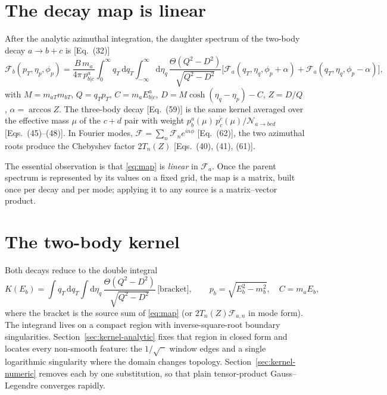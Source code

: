\documentclass[11pt]{article}
\newcommand{\Fa}{\mathcal{F}_a}
\newcommand{\Fb}{\mathcal{F}_b}
\newcommand{\Fan}{\mathcal{F}_{a,n}}
\begin{document}
\section{The decay map is linear}

After the analytic azimuthal integration, the daughter spectrum of the
two-body decay $a\to b+c$ is [Eq.~(32)]
\begin{equation}
\Fb(p_T,\eta_p,\phi_p)
 = \frac{B\,m_a}{4\pi\,p^a_{b|c}}
 \int_0^\infty \! q_T\,\mathrm{d}q_T \int_{-\infty}^{\infty}\!\mathrm{d}\eta_q\,
 \frac{\Theta\!\left(Q^2-D^2\right)}{\sqrt{Q^2-D^2}}
 \Big[\Fa(q_T,\eta_q,\phi_p+\alpha)+\Fa(q_T,\eta_q,\phi_p-\alpha)\Big],
 \label{eq:map}
\end{equation}
with $M=m_{aT}m_{bT}$, $Q=q_Tp_T$, $C=m_aE^a_{b|c}$,
$D=M\cosh(\eta_q-\eta_p)-C$, $Z=D/Q$, $\alpha=\arccos Z$.  The three-body
decay [Eq.~(59)] is the same kernel averaged over the effective mass $\mu$
of the $c+d$ pair with weight $p^a_b(\mu)\,p^{\tilde c}_c(\mu)/\mathcal
N_{a\to bcd}$ [Eqs.~(45)--(48)].  In Fourier modes,
$\mathcal F=\sum_n \mathcal F_n e^{in\phi}$ [Eq.~(62)], the two azimuthal
roots produce the Chebyshev factor $2T_n(Z)$ [Eqs.~(40), (41), (61)].

The essential observation is that \eqref{eq:map} is \emph{linear} in
$\Fa$.  Once the parent spectrum is represented by its values on a fixed
grid, the map is a matrix, built once per decay and per mode; applying it
to any source is a matrix--vector product.

\section{The two-body kernel}
\label{sec:quadrature}

Both decays reduce to the double integral
\begin{equation}
K(E_b)=\int q_T\,\mathrm{d}q_T\int\mathrm{d}\eta_q\,
\frac{\Theta\!\left(Q^2-D^2\right)}{\sqrt{Q^2-D^2}}\,
\big[\text{bracket}\big],
\qquad p_b=\sqrt{E_b^2-m_b^2},\quad C=m_aE_b,
\label{eq:K}
\end{equation}
where the bracket is the source sum of \eqref{eq:map} (or $2T_n(Z)\Fan$
in mode form).  The integrand lives on a compact region with
inverse-square-root boundary singularities.  Section~\ref{sec:kernel-analytic}
fixes that region in closed form and locates every non-smooth feature: the
$1/\sqrt{\phantom{x}}$ window edges and a single logarithmic singularity where
the domain changes topology.  Section~\ref{sec:kernel-numeric} removes each by
one substitution, so that plain tensor-product Gauss--Legendre converges
rapidly.
\end{document}
